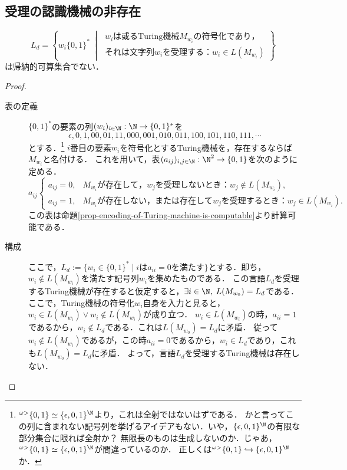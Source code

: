 \subsection{受理の認識機械の非存在}

\begin{theorem}[受理の認識機械の非存在]\label{thm-受理の認識機械の非存在}
    \[L_d=\left\{w_i\{0,1\}^*\;\middle|\;\begin{array}{l}
        w_iは或る\mathrm{Turing}機械M_{w_i}の符号化であり，\\
        それは文字列w_iを受理する：w_i\in L(M_{w_i})
    \end{array}\right\}\]
    は帰納的可算集合でない．
\end{theorem}
\begin{proof}\mbox{}
    \begin{description}
        \item[表の定義] 
    $\{0,1\}^*$の要素の列$(w_i)_{i\in\N}:\N\to\{0,1\}^*$を
    \[\epsilon,0,1,00,01,11,000,001,010,011,100,101,110,111,\cdots\]
    とする．\footnote{${}^{\omega>}\{0,1\}\simeq\{\epsilon,0,1\}^\N$より，これは全射ではないはずである．
    かと言ってこの列に含まれない記号列を挙げるアイデアもない．いや，$\{\epsilon,0,1\}^\N$の有限な部分集合に限れば全射か？
    無限長のものは生成しないのか．じゃあ，${}^{\omega>}\{0,1\}\simeq\{\epsilon,0,1\}^\N$が間違っているのか．
    正しくは${}^{\omega>}\{0,1\}\hookrightarrow\{\epsilon,0,1\}^\N$か．}
    $i$番目の要素$w_i$を符号化とするTuring機械を，存在するならば$M_{w_i}$と名付ける．
    これを用いて，表$(a_{ij})_{i,j\in\N}:\N^2\to\{0,1\}$を次のように定める．
    \[a_{ij}\begin{cases}
        a_{ij}=0,&M_{w_i}が存在して，w_jを受理しないとき：w_j\notin L(M_{w_i}),\\
        a_{ij}=1,&M_{w_i}が存在しない，または存在してw_jを受理するとき：w_j\in L(M_{w_i}).
    \end{cases}\]
    この表は命題\ref{prop-encoding-of-Turing-machine-is-computable}より計算可能である．
        \item[構成]
    ここで，$L_d:=\{w_i\in\{0,1\}^*\mid iはa_{ii}=0を満たす\}$とする．即ち，$w_i\notin L(M_{w_i})$を満たす記号列$w_i$を集めたものである．
    この言語$L_d$を受理するTuring機械が存在すると仮定すると，$\exists i\in\N,\;L(M_{w_0})=L_d$である．
    ここで，Turing機械の符号化$w_i$自身を入力と見ると，$w_i\in L(M_{w_i})\lor w_i\notin L(M_{w_i})$が成り立つ．
    $w_i\in L(M_{w_i})$の時，$a_{ii}=1$であるから，$w_i\notin L_d$である．これは$L(M_{w_0})=L_d$に矛盾．
    従って$w_i\notin L(M_{w_i})$であるが，この時$a_{ii}=0$であるから，$w_i\in L_d$であり，これも$L(M_{w_0})=L_d$に矛盾．
    よって，言語$L_d$を受理するTuring機械は存在しない．
    \end{description}
\end{proof}
